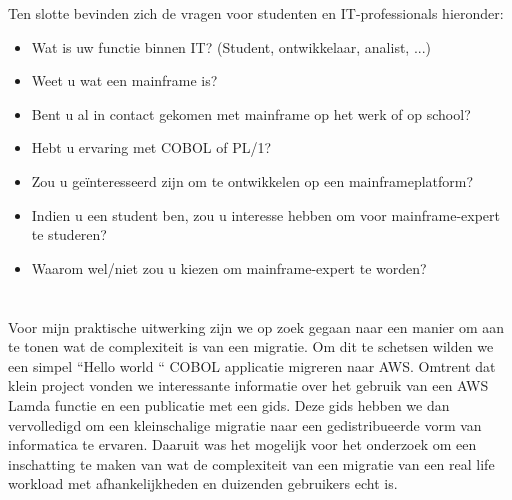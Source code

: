 Ten slotte bevinden zich de vragen voor studenten en IT-professionals hieronder:
 \begin{itemize}
    \item Wat is uw functie binnen IT? (Student, ontwikkelaar, analist, ...)
    \item Weet u wat een mainframe is?
    \item Bent u al in contact gekomen met mainframe op het werk of op school?
    \item Hebt u ervaring met COBOL of PL/1?
    \item Zou u geïnteresseerd zijn om te ontwikkelen op een mainframeplatform?
    \item Indien u een student ben, zou u interesse hebben om voor mainframe-expert te studeren?
    \item Waarom wel/niet zou u kiezen om mainframe-expert te worden?
\end{itemize}



\section{}
\label{sec:De praktische uitwerking}

Voor mijn praktische uitwerking zijn we op zoek gegaan naar een manier om aan te tonen wat de complexiteit is van een migratie. Om dit te schetsen wilden we een simpel ``Hello world `` COBOL applicatie migreren naar AWS. Omtrent dat klein project vonden we interessante informatie over het gebruik van een AWS Lamda functie en een publicatie met een gids. Deze gids hebben we dan vervolledigd om een kleinschalige migratie naar een gedistribueerde vorm van informatica te ervaren. Daaruit was het mogelijk voor het onderzoek om een inschatting te maken van wat de complexiteit van een migratie van een real life workload met afhankelijkheden en duizenden gebruikers echt is.
